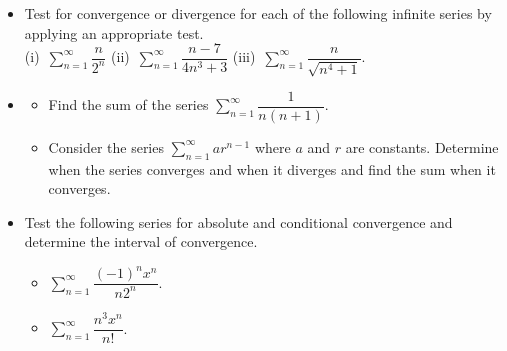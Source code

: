 \documentclass[12pt]{uz-exame}
\begin{document}
\begin{question}
\begin{itemize}
\item[(a)] Test for convergence or divergence for each of the following infinite series by applying an appropriate test.\\
(i)\, $\displaystyle \sum _{n=1}^\infty \dfrac{n}{2^n}$ \quad (ii)\, $\displaystyle \sum _{n=1}^\infty \dfrac{n-7}{4n^3+3}$ \quad (iii)\, $\displaystyle \sum _{n=1}^\infty \dfrac{n}{\sqrt{n^4+1}}$. 
\item[(b)] \begin{itemize}
\item[(i)] Find the sum of the series $\displaystyle \sum _{n=1}^\infty\dfrac{1}{n(n+1)}$. 
\item[(ii)] Consider the series $\displaystyle \sum _{n=1}^\infty ar^{n-1}$ where $a$ and $r$ are constants. Determine when the series converges and when it diverges and find the sum when it converges. 
\end{itemize}
\item[(c)] Test the following series for absolute and conditional convergence and determine the interval of convergence.
\begin{itemize}
\item[(i)] $\displaystyle \sum _{n=1}^\infty \dfrac{(-1)^n x^n}{n2^n}$. 
\item[(ii)] $\displaystyle \sum _{n=1}^\infty \dfrac{n^3x^n}{n!} $. 
\end{itemize}
\end{itemize}
\end{question}
\endexam
\end{document}

